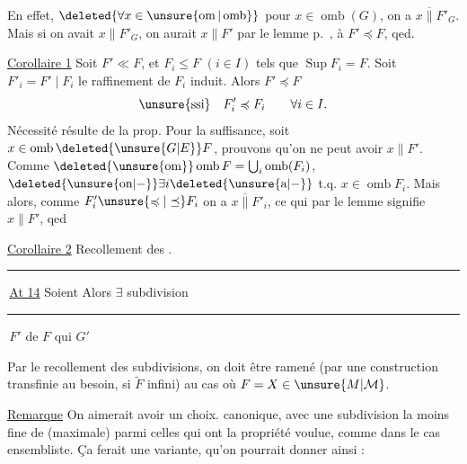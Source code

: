 En effet,   $\deleted{\forall x\in\unsure{\operatorname{om}|\operatorname{omb}}}$ pour $x\in\operatorname{omb}(G)$, on a $x\mathrel{\overline{\parallel}}F'_G$. Mais si on avait $x\parallel F'_G$, on aurait $x\parallel F'$ par le lemme p.~,  à $F'\preccurlyeq F$, qed.

\uline{Corollaire 1} \quad Soit $F'\ll F$, et $F_i\leqslant F$ $(i\in I)$ tels que $\operatorname{Sup} F_i=F$. Soit $F'_i=F'\mid F_i$ le raffinement de $F_i$ induit. Alors $F'\preccurlyeq F$
\[
\text{\unsure{ssi}}\quad F'_i\preccurlyeq F_i\qquad\forall i\in I.
\]
Nécessité résulte de la prop. Pour la suffisance, soit $x\in\operatorname{omb}\deleted{\unsure{G|E}}F$, prouvons qu'on ne peut avoir $x\parallel F'$. Comme $\deleted{\unsure{\operatorname{om}}}\operatorname{omb}F=\bigcup_i\operatorname{omb}(F_i)$, $\deleted{\unsure{\text{on}|{-}}}\exists i\deleted{\unsure{\text{a}|{-}}}$ t.q. $x\in\operatorname{omb}F_i$. Mais alors, comme $F'_i\unsure{\preccurlyeq|\preceq}F_i$ on a $x\mathrel{\overline{\parallel}}F'_i$, ce qui par le lemme signifie $x\parallel F'$, qed

\uline{Corollaire 2} \quad Recollement des .

\rule[-.4ex]{.4pt}{2.4ex}\,\uline{At 14} \quad Soient
Alors $\exists$ subdivision \rule[-.4ex]{.4pt}{2.4ex}\,$F'$ de $F$ qui  $G'$

Par le recollement des subdivisions, on doit être ramené (par une construction transfinie au besoin, si $\widetilde F$ infini) au cas où $F=X\in\unsure{M|\mathcal M}$.

\uline{Remarque} \quad On aimerait avoir un choix. canonique, avec une subdivision  la moins fine de  (maximale) parmi celles qui ont la propriété voulue, comme dans le cas ensembliste. Ça ferait une variante, qu'on pourrait donner ainsi :
